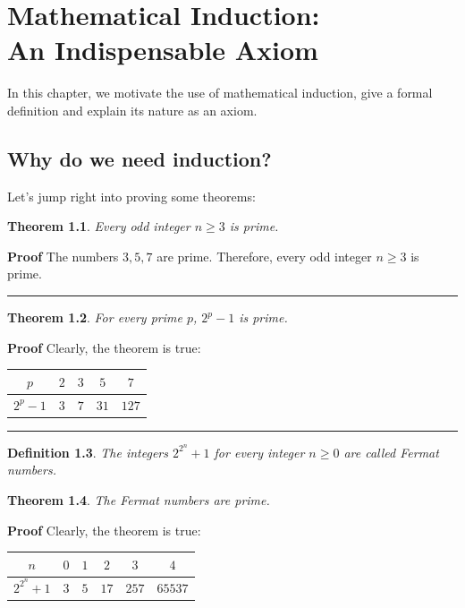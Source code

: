 \documentclass[11pt,a4paper]{report}
\newcommand*{\qed}{\hfill\rule{1ex}{1.5ex}}
\newcommand*{\qedd}[1]{\vspace*{-#1ex}\qed}
\newtheorem{theorem}{Theorem}
\newtheorem{definition}[theorem]{Definition}
\begin{document}

\chapter[Mathematical Induction: An Indispensable Axiom]{Mathematical Induction:\\An Indispensable Axiom}\label{s.axiom}

In this chapter, we motivate the use of mathematical induction, give a formal definition and explain its nature as an axiom.

\section{Why do we need induction?}\label{s.why}

Let's jump right into proving some theorems:

\begin{theorem}\label{t.odd}
Every odd integer $n\geq 3$ is prime.
\end{theorem}

\textbf{Proof} The numbers $3,5,7$ are prime. Therefore, every odd integer $n\geq 3$ is prime.\qed

\begin{theorem}\label{t.odd-prime}
For every prime $p$, $2^p-1$ is prime.
\end{theorem}

\textbf{Proof} 
Clearly, the theorem is true:
\begin{center}
\begin{tabular}{|c|c|c|c|c|}
\hline
$p$ & $2$ & $3$ & $5$ & $7$ \\\hline
$2^p-1$ & $3$ & $7$ & $31$ & $127$ \\\hline
\end{tabular}
\end{center}

\qedd{4}

\begin{definition}
The integers $2^{2^{n}}+1$ for every integer $n\geq 0$ are called \emph{Fermat numbers}.
\end{definition}

\vspace*{-3ex}

\begin{theorem}\label{t.fermat}
The Fermat numbers are prime.
\end{theorem}

\textbf{Proof} 
Clearly, the theorem is true:
\begin{center}
\renewcommand{\arraystretch}{1.3}
\begin{tabular}{|c|c|c|c|c|c|}
\hline
$n$ & $0$ & $1$ & $2$ & $3$ & $4$ \\\hline
$2^{2^{n}}+1$ & $3$ & $5$ & $17$ & $257$ & $65537$ \\\hline
\end{tabular}
\end{center}
\end{document}
